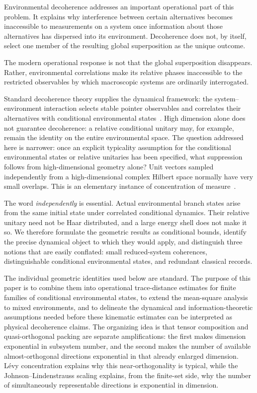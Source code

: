 \documentclass[aps,pra,reprint,superscriptaddress,nofootinbib,longbibliography]{revtex4-2}
\begin{document}
Environmental
decoherence addresses an important operational part of this problem.  It
explains why interference between certain alternatives becomes inaccessible
to measurements on a system once information about those alternatives has
dispersed into its environment.  Decoherence does not, by itself, select one
member of the resulting global superposition as the unique outcome.



The modern operational response is not that the global superposition
disappears.  Rather, environmental
correlations make its relative phases inaccessible to the restricted
observables by which macroscopic systems are ordinarily interrogated.

Standard decoherence theory supplies the dynamical framework: the
system--environment interaction selects stable pointer observables and
correlates their alternatives with conditional environmental
states~\cite{joos1985emergence,RevModPhys.75.715,joos2003decoherence,schlosshauer-2007}.
High dimension alone does not guarantee decoherence: a relative conditional
unitary may, for example, remain the identity on the entire environmental
space.  The question addressed here is narrower: once an explicit typicality
assumption for the conditional environmental states or relative unitaries has
been specified, what suppression follows from high-dimensional geometry
alone?  Unit vectors sampled independently from a high-dimensional complex
Hilbert space normally have very small overlaps.  This is an elementary
instance of concentration of
measure~\cite{tao2012topics,vershynin2018high,ledoux2001concentration,milman1986asymptotic}.

The word \emph{independently} is essential.  Actual environmental branch
states arise from the same initial state under correlated conditional
dynamics.  Their relative unitary need not be Haar distributed, and a large
energy shell does not make it so.  We therefore formulate the geometric
results as conditional bounds, identify the precise dynamical object to which
they would apply, and distinguish three notions that are easily conflated:
small reduced-system coherences, distinguishable conditional environmental
states, and redundant classical records.

The individual geometric identities used below are standard.  The purpose of
this paper is to combine them into operational trace-distance estimates for
finite families of conditional environmental states, to extend the
mean-square analysis to mixed environments, and to delineate the dynamical
and information-theoretic assumptions needed before these kinematic estimates
can be interpreted as physical decoherence claims.  The organizing idea is
that tensor composition and quasi-orthogonal packing are separate
amplifications: the first makes dimension exponential in subsystem number,
and the second makes the number of available almost-orthogonal directions
exponential in that already enlarged dimension.  L\'evy concentration
explains why this near-orthogonality is typical, while the
Johnson--Lindenstrauss scaling explains, from the finite-set side, why the
number of simultaneously representable directions is exponential in
dimension.
\end{document}
